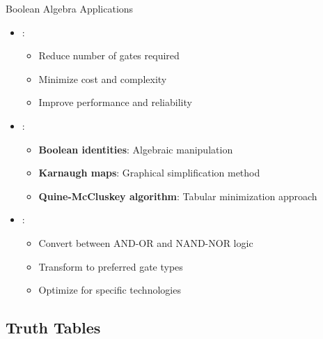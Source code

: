 \begin{frame}{Boolean Algebra Applications}
\begin{itemize}
\item {}:
\begin{itemize}
\item Reduce number of gates required
\item Minimize cost and complexity
\item Improve performance and reliability
\end{itemize}
\vspace{0.5cm}
\item {}:
\begin{itemize}
\item \textbf{Boolean identities}: Algebraic manipulation
\item \textbf{Karnaugh maps}: Graphical simplification method
\item \textbf{Quine-McCluskey algorithm}: Tabular minimization approach
\end{itemize}
\vspace{0.5cm}
\item {}:
\begin{itemize}
\item Convert between AND-OR and NAND-NOR logic
\item Transform to preferred gate types
\item Optimize for specific technologies
\end{itemize}
\end{itemize}
\end{frame}

\subsection{Truth Tables}


